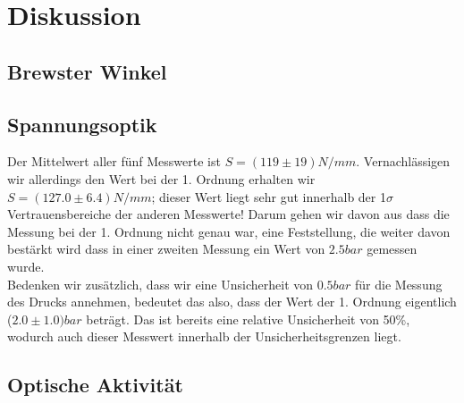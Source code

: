 \documentclass[twoside]{article}
\begin{document}
\section{Diskussion}
\subsection{Brewster Winkel}
\subsection{Spannungsoptik}

Der Mittelwert aller fünf Messwerte ist $S=(119 \pm 19)\si{N/mm}$. Vernachlässigen wir allerdings den Wert bei der 1. Ordnung erhalten wir $S=(127.0 \pm 6.4)\si{N/mm}$; dieser Wert liegt sehr gut innerhalb der 1$\sigma$ Vertrauensbereiche der anderen Messwerte! Darum gehen wir davon aus dass die Messung bei der 1. Ordnung nicht genau war, eine Feststellung, die weiter davon bestärkt wird dass in einer zweiten Messung ein Wert von $2.5 \si{bar}$ gemessen wurde.\\
Bedenken wir zusätzlich, dass wir eine Unsicherheit von $0.5 \si{bar}$ für die Messung des Drucks annehmen, bedeutet das also, dass der Wert der 1. Ordnung eigentlich ($2.0 \pm 1.0)\si{bar}$ beträgt. Das ist bereits eine relative Unsicherheit von 50\%, wodurch auch dieser Messwert innerhalb der Unsicherheitsgrenzen liegt. 

\subsection{Optische Aktivität}
																					
\end{document}
